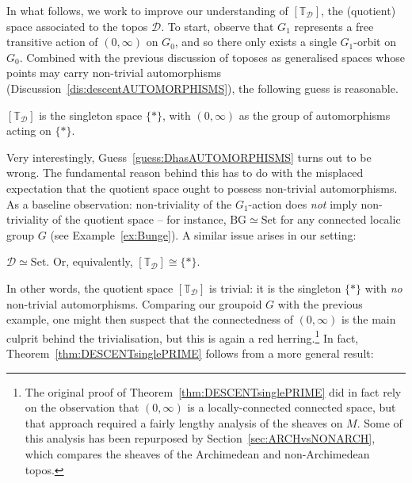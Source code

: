\documentclass[a4paper, 11pt,reqno]{amsart}
\newcommand{\Set}{\mathrm{Set}}
\newcommand{\thT}{\mathbb{T}}
\newcommand{\D}{\mathcal{D}}
\newcommand{\BG}{\mathrm{BG}}
\begin{document}
In what follows, we work to improve our understanding of $[\thT_\D]$, the (quotient) space associated to the topos $\D$. To start, observe that $G_1$ represents a free transitive action of $(0,\infty)$ on $G_0$, and so there only exists a single $G_1$-orbit on $G_0$. Combined with the previous discussion of toposes as generalised spaces whose points may carry non-trivial automorphisms (Discussion~\ref{dis:descentAUTOMORPHISMS}), the following guess is reasonable.


\begin{guess}\label{guess:DhasAUTOMORPHISMS}  $[\thT_\D]$ is the singleton space $\{*\}$, with $(0,\infty)$ as the group of automorphisms acting on $\{*\}$.
\end{guess}

Very interestingly, Guess~\ref{guess:DhasAUTOMORPHISMS} turns out to be wrong. The fundamental reason behind this has to do with the misplaced expectation that  the quotient space ought to possess non-trivial automorphisms. As a baseline observation: non-triviality of the $G_1$-action does {\em not} imply non-triviality of the quotient space -- for instance, $\BG\simeq \Set$ for any connected localic group $G$ (see Example~\ref{ex:Bunge}). A similar issue arises in our setting: 

\begin{theorem:SINGLEPRIME}	$\mathcal{D}\simeq\Set$. Or, equivalently, $[\thT_\D]\cong \{*\}$.
\end{theorem:SINGLEPRIME}





In other words, the quotient space $[\thT_\D]$ is trivial: it is the singleton $\{*\}$ with \emph{no} non-trivial automorphisms. Comparing our groupoid $G$ with the previous example, one might then suspect that the connectedness of $(0,\infty)$ is the main culprit behind the trivialisation, but this is again a red herring.\footnote{The original proof of Theorem~\ref{thm:DESCENTsinglePRIME} did in fact rely on the observation that $(0,\infty)$ is a locally-connected connected space, but that approach required a fairly lengthy analysis of the sheaves on $M$. Some of this analysis has been repurposed by Section~\ref{sec:ARCHvsNONARCH}, which compares the sheaves of the Archimedean and non-Archimedean topos.} In fact, Theorem~\ref{thm:DESCENTsinglePRIME} follows from a more general result:
\end{document}
